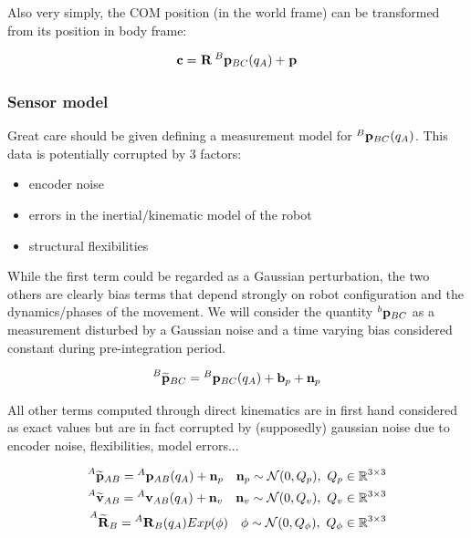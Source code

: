 \documentclass[11pt]{article}
\newcommand{\Rot}[2]{\prescript{#1}{}{\bfR}_{#2}}
\newcommand{\Rotm}[2]{\prescript{#1}{}{\widetilde{\bfR}}_{#2}}
\newcommand{\noise}{\bfn}
\newcommand{\bias}{\bfb}
\newcommand{\posi}[2]{\prescript{#1}{}{\bfp}_{#2}}
\newcommand{\posim}[2]{\prescript{#1}{}{\widetilde{\bfp}}_{#2}}
\newcommand{\vel}[2]{\prescript{#1}{}{\bfv}_{#2}}
\newcommand{\velm}[2]{\prescript{#1}{}{\widetilde{\bfv}}_{#2}}
\newcommand{\COM}{\bfc}
\newcommand{\Gaussian}[2]{\mathcal{N}({#1},{#2})}
\newcommand{\Reals}{\mathbb{R}}
\begin{document}
Also very simply, the COM position (in the world frame) can be transformed from its position in body frame:

\begin{equation}
    \COM = \Rot{}{} \posi{B}{BC}(q_A) + \posi{}{}
\end{equation}

\subsubsection{Sensor model}
Great care should be given defining a measurement model for \(\posi{B}{BC}(q_A)\). This data is potentially corrupted by 3 factors:

\begin{itemize}
    \item encoder noise
    \item errors in the inertial/kinematic model of the robot
    \item structural flexibilities
\end{itemize}

While the first term could be regarded as a Gaussian perturbation, the two others are clearly bias terms that depend strongly on robot configuration and the dynamics/phases of the movement.  
We will consider the quantity $\posi{b}{BC}$  as a measurement disturbed by a Gaussian noise and a time varying bias considered constant during pre-integration period.

\begin{equation}
\posim{B}{BC} = \posi{B}{BC}(q_A) + \bias_{p} + \noise_p 
\end{equation}


All other terms computed through direct kinematics are in first hand considered as exact values but are in fact corrupted by (supposedly) gaussian noise due to encoder noise, flexibilities, model errors...

\begin{equation}
\begin{split}
\posim{A}{AB} = \posi{A}{AB}(q_A) + \noise_p ~~~ \noise_p \sim \Gaussian{0}{Q_p}, ~ Q_p \in \Reals^{3\times 3} 
\\
\velm{A}{AB} = \vel{A}{AB}(q_A) + \noise_v ~~~ \noise_v \sim \Gaussian{0}{Q_v}, ~ Q_v \in \Reals^{3\times 3} 
\\
\Rotm{A}{B} = \Rot{A}{B}(q_A) Exp(\phi) ~~~ \phi \sim \Gaussian{0}{Q_{\phi}}, ~ Q_{\phi} \in \Reals^{3\times 3}
\end{split}
\end{equation}
 
\end{document}
